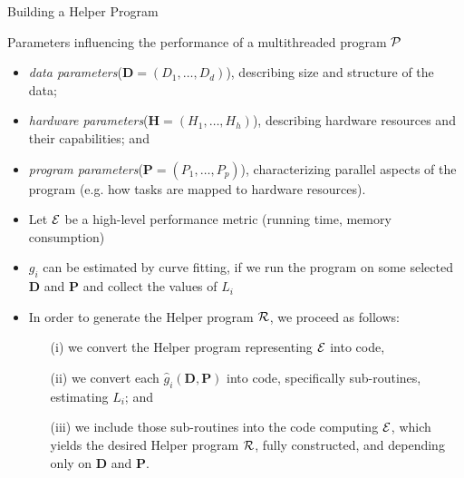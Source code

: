 \begin{frame}{Building a Helper Program}
	\begin{block}{}
		Parameters influencing the performance of a multithreaded program $\cal P$
		\begin{itemize}
			\item {\em data parameters}(${\bm D} = \left(D_1, \ldots, D_d\right)$), describing size and structure of the data;
			\item {\em hardware parameters}(${\bm H} = \left(H_1, \ldots, H_h\right)$), describing hardware resources and their capabilities; and
			\item {\em program parameters}(${\bm P} = \left(P_1, \ldots, P_p\right)$), characterizing parallel aspects of the program (e.g. how tasks are mapped to hardware resources).
		\end{itemize}
		\begin{block}{}
            \begin{itemize}
                \item Let ${\cal E}$ be a high-level performance metric (running time, memory consumption)
                \item $g_i$ can be estimated by curve fitting, if we run the program on some selected $\bm D$ and $\bm P$ and collect the values of $L_i$
                \item In order to generate the Helper program ${\cal R}$, we proceed as follows:
                \begin{itemize}
                    \item[(i)] we convert the Helper program representing ${\cal E}$ into code, 
                    \item[(ii)] we convert each $\hat{g}_i(\bm{D}, \bm{P})$ into code, specifically sub-routines, estimating $L_i$; and
                    \item[(iii)] we include those sub-routines into the code computing ${\cal E}$, which yields the desired Helper program ${\cal R}$, fully constructed, and depending only on $\bm{D}$ and $\bm{P}$.
                \end{itemize}
            \end{itemize}
        \end{block}
	\end{block}
\end{frame}

